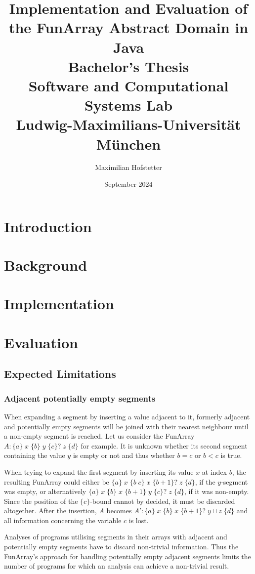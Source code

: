 \documentclass{report}
\title{Implementation and Evaluation of the FunArray Abstract Domain in Java\\[1em]\large{}Bachelor's Thesis\\[1em]Software and Computational Systems Lab\\Ludwig-Maximilians-Universit\"at M\"unchen}
\date{September 2024}
\author{Maximilian Hofstetter}
\newcommand{\funArray}[1]{$#1$}
\newcommand{\bound}[1]{\{#1\}}
\newcommand{\fvalue}[1]{\;#1\;}
\begin{document}
\maketitle

\chapter{Introduction}
\chapter{Background}
\chapter{Implementation}
\chapter{Evaluation}

\section{Expected Limitations}
\subsection{Adjacent potentially empty segments}
When expanding a segment by inserting a value adjacent to it, formerly adjacent and potentially empty segments will be joined with their nearest neighbour until a non-empty segment is reached. Let us consider the FunArray \funArray{A:\bound{a} \fvalue{x} \bound{b} \fvalue{y} \bound{c}? \fvalue{z} \bound{d}} for example. It is unknown whether its second segment containing the value $y$ is empty or not and thus whether $b=c$ or $b<c$ is true.

When trying to expand the first segment by inserting its value $x$ at index $b$, the resulting FunArray could either be \funArray{\bound{a} \fvalue{x} \bound{b\;c} \fvalue{x} \bound{b+1}? \fvalue{z} \bound{d}}, if the $y$-segment was empty, or alternatively \funArray{\bound{a} \fvalue{x} \bound{b} \fvalue{x} \bound{b+1} \fvalue{y} \bound{c}? \fvalue{z} \bound{d}}, if it was non-empty. Since the position of the \funArray{\bound{c}}-bound cannot by decided, it must be discarded altogether. After the insertion, $A$ becomes \funArray{A':\bound{a} \fvalue{x} \bound{b} \fvalue{x} \bound{b+1}? \fvalue{y\sqcup z} \bound{d}} and all information concerning the variable $c$ is lost.

 Analyses of programs utilising segments in their arrays with adjacent and potentially empty segments have to discard non-trivial information. Thus the FunArray's approach for handling potentially empty adjacent segments limits the number of programs for which an analysis can achieve a non-trivial result.
 
\end{document}
